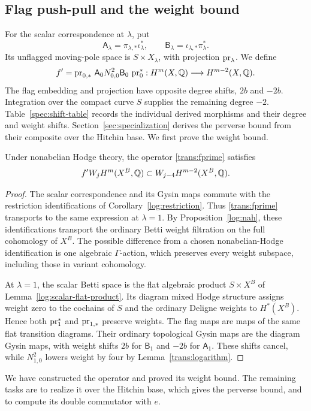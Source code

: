 \subsection{Flag push-pull and the weight bound}

For the scalar correspondence at $\lambda$, put
\[
\mathsf A_\lambda=\pi_{\lambda,*}\iota_\lambda^*,
\qquad
\mathsf B_\lambda=\iota_{\lambda,*}\pi_\lambda^*.
\]
Its unflagged moving-pole space is $S\times X_\lambda$, with projection $\operatorname{pr}_\lambda$. We define
\begin{equation}\label{trans:fprime}
f'=\operatorname{pr}_{0,*}\,\mathsf A_0 N_{0,0}^2\mathsf B_0\,\operatorname{pr}_0^*
:H^m(X,\mathbb Q)\longrightarrow H^{m-2}(X,\mathbb Q).
\end{equation}
The flag embedding and projection have opposite degree shifts, $2b$ and
$-2b$. Integration over the compact curve $S$ supplies the remaining
degree $-2$. Table~\ref{spec:shift-table} records the individual derived morphisms
and their degree and weight shifts. Section~\ref{sec:specialization}
derives the perverse bound from their composite over the Hitchin base.
We first prove the weight bound.

\begin{proposition}\label{trans:weights}
Under nonabelian Hodge theory, the operator \eqref{trans:fprime} satisfies
\[
f'W_jH^m(X^B,\mathbb Q)\subset W_{j-4}H^{m-2}(X^B,\mathbb Q).
\]
\end{proposition}

\begin{proof}
The scalar correspondence and its Gysin maps commute with the restriction identifications of Corollary~\ref{log:restriction}. Thus \eqref{trans:fprime} transports to the same expression at $\lambda=1$. By Proposition~\ref{log:nah}, these identifications transport the ordinary Betti weight filtration on the full cohomology of $X^B$. The possible difference from a chosen nonabelian-Hodge identification is one algebraic $\Gamma$-action, which preserves every weight subspace, including those in variant cohomology.

At $\lambda=1$, the scalar Betti space is the flat algebraic product $S\times X^B$ of Lemma~\ref{log:scalar-flat-product}. Its diagram mixed Hodge structure assigns weight zero to the cochains of $S$ and the ordinary Deligne weights to $H^*(X^B)$. Hence both $\operatorname{pr}_1^*$ and $\operatorname{pr}_{1,*}$ preserve weights. The flag maps are maps of the same flat transition diagrams. Their ordinary topological Gysin maps are the diagram Gysin maps, with weight shifts $2b$ for $\mathsf B_1$ and $-2b$ for $\mathsf A_1$. These shifts cancel, while $N_{1,0}^2$ lowers weight by four by Lemma~\ref{trans:logarithm}.
\end{proof}

We have constructed the operator and proved its weight bound. The remaining tasks are to realize it over the Hitchin base, which gives the perverse bound, and to compute its double commutator with $e$.
